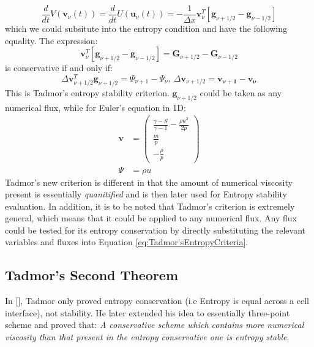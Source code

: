 \documentclass[a4paper]{article}
\numberwithin{equation}{section}
\begin{document}
\begin{equation}\label{eq:Convert1}
    \frac{d}{dt}V(\mathbf{v}_\nu(t)) = \frac{d}{dt} U(\mathbf{u}_\nu(t)) = -\frac{1}{\Delta x} \mathbf{v}_\nu^T \left[\mathbf{g}_{\nu + 1/2} - \mathbf{g}_{\nu - 1/2}\right]
\end{equation}
which we could subsitute into the entropy condition and have the following equality. The expression:
\begin{equation}\label{eq:Convert2}
    \mathbf{v}_\nu^T \left[\mathbf{g}_{\nu + 1/2} - \mathbf{g}_{\nu - 1/2} \right] = \mathbf{G}_{\nu + 1/2} - \mathbf{G}_{\nu - 1/2}
\end{equation}
is conservative if and only if:
\begin{equation}\label{eq:Tadmor'sEntropyCriteria}
    \Delta \mathbf{v}_{\nu + 1/2}^T \mathbf{g}_{\nu + 1/2} = \Psi_{\nu + 1} - \Psi_\nu, \ \Delta \mathbf{v}_{\nu + 1/2} = \mathbf{v_{\nu + 1}} - \mathbf{v}_\mathbf{\nu}
\end{equation}
This is Tadmor's entropy stability criterion. $\mathbf{g}_{\nu + 1/2}$ could be taken as any numerical flux, while for Euler's equation in 1D:
\begin{equation}
    \begin{split}
        \mathbf{v} &= 
        \begin{pmatrix}
            \frac{\gamma - S}{\gamma - 1}-\frac{\rho u^2}{2p} \\
            \frac{m}{p}\\
            -\frac{\rho}{p}
        \end{pmatrix}\\
        \Psi &= \rho u
    \end{split}
\end{equation} 
Tadmor's new criterion is different in that the amount of numerical viscosity present is essentially \textit{quanitified} and is then later used for Entropy stability evaluation. In addition, it is to be noted that Tadmor's criterion is extremely general, which means that it could be applied to any numerical flux. Any flux could be tested for its entropy conservation by directly substituting the relevant variables and fluxes into Equation \ref{eq:Tadmor'sEntropyCriteria}.
\subsection{Tadmor's Second Theorem}
In [], Tadmor only proved entropy conservation (i.e Entropy is equal across a cell interface), not stability. He later extended his idea to essentially three-point scheme and proved that: \textit{A conservative scheme which contains more numerical viscosity than that present in the entropy conservative one is entropy stable}. 
\end{document}
